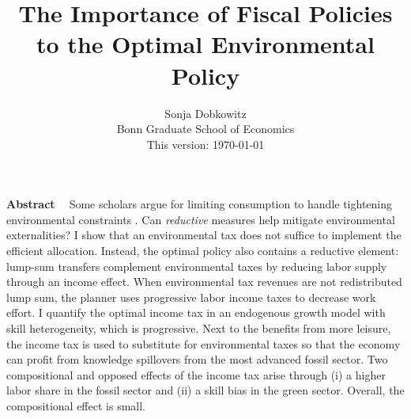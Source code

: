 \documentclass[12pt]{article}
\title{The Importance of Fiscal Policies to the Optimal Environmental Policy}
\date{Sonja Dobkowitz\\ Bonn Graduate School of Economics\\ %
\vspace{1mm}
This version: \today }
\renewenvironment{abstract}
{\small
	\list{}{
		\setlength{\leftmargin}{0.025\textwidth}%
		\setlength{\rightmargin}{\leftmargin}%
	}%
	\item\relax}
{\endlist}
\begin{document}
%	
	\maketitle
	\begin{abstract}
		\begin{singlespacing}
			\textbf{Abstract \ }
			Some scholars argue for limiting consumption to handle tightening environmental constraints \citep{Schor2005SustainableReduction, VanVuuren2018AlternativeTechnologies}. Can \textit{reductive} measures help mitigate environmental externalities?
			 I show that an environmental tax does not suffice to implement the efficient allocation. Instead, the optimal policy also contains a reductive element: lump-sum transfers complement environmental taxes by reducing labor supply through an income effect.
			 When environmental tax revenues are not redistributed lump sum, the planner uses progressive labor income taxes to decrease work effort. %
			I quantify the optimal income tax in an endogenous growth model with skill heterogeneity, which is progressive. Next to the benefits from more leisure, the income tax is used to substitute for environmental taxes so that the economy can profit from knowledge spillovers from the most advanced fossil sector. 	
			Two compositional and opposed effects of the income tax arise through (i) a higher labor share in the fossil sector and (ii) a skill bias in the green sector. Overall, the compositional effect is small.	


\end{singlespacing}
\end{abstract}
\end{document}
